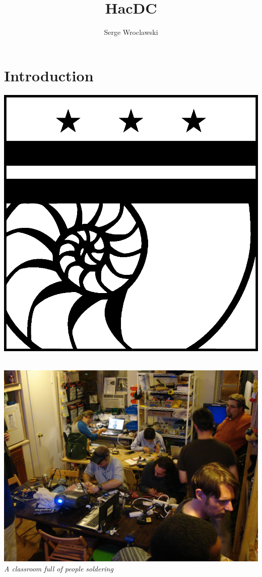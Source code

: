 \documentclass[notes]{beamer}
\title{HacDC}
\author{Serge Wroclawski}
\begin{document}
\section{Introduction}

\begin{frame}[fragile]
  \titlepage
  \begin{center}
    \includegraphics[height=.3\textheight]{hacdc-logo}\\
    \\[2.5ex]
    {\tiny\CcNote{\CcLongnameBySa}}
  \end{center}
\end{frame}

\begin{frame}
  \begin{center}
  \includegraphics[height=.8\textheight]{soldering.jpg}\\
  {\small {\em A classroom full of people soldering}}
\end{center}
\end{frame}
\end{document}

